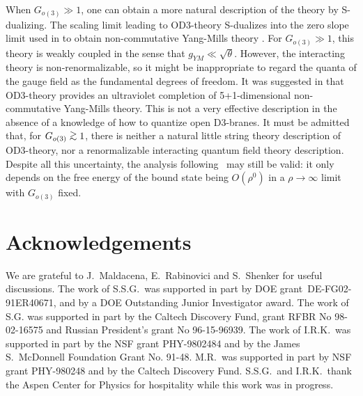 When $G_{o(3)} \gg 1$, one can obtain a more natural description of
the theory by S-dualizing.  The scaling limit leading to OD3-theory
S-dualizes into the zero slope limit used in \cite{SW} to obtain
non-commutative Yang-Mills theory \cite{GMSS}.  For $G_{o(3)} \gg 1$,
this theory is weakly coupled in the sense that $g_{YM} \ll
\sqrt{\theta}$.  However, the interacting theory is
non-renormalizable, so it might be inappropriate to regard the quanta of
the gauge field as the fundamental degrees of freedom.  It was
suggested in \cite{GMSS} that OD3-theory provides an ultraviolet
completion of 5+1-dimensional non-commutative Yang-Mills theory.  This
is not a very effective description in the absence of a knowledge of
how to quantize open
D3-branes.  It must be admitted that, for $G_{o(3)} \gsim
1$, there is neither a natural little string theory description of
OD3-theory, nor a renormalizable interacting quantum field theory
description.  Despite all this uncertainty, the analysis following
\FrhoForm\ may still be valid: it only depends on the free energy of
the bound state being $O(\rho^0)$ in a $\rho \to \infty$ limit with
$G_{o(3)}$ fixed.







\section*{Acknowledgements}

We are grateful to J.~Maldacena, E.~Rabinovici and S.~Shenker
for useful discussions.  The work of
S.S.G.\ was supported in part by DOE grant~DE-FG02-91ER40671, and by a
DOE Outstanding Junior Investigator award.
The work of S.G. was supported in part by the Caltech Discovery Fund,
grant RFBR No 98-02-16575 and Russian President's grant No 96-15-96939.
The work of I.R.K.\ was
supported in part by the NSF grant PHY-9802484 and by the James
S.~McDonnell Foundation Grant No. 91-48. M.R.\ was supported in part by
NSF grant PHY-980248 and by the Caltech Discovery Fund.
S.S.G.\ and I.R.K.\ thank
the Aspen Center for Physics for hospitality while this work was in
progress.



